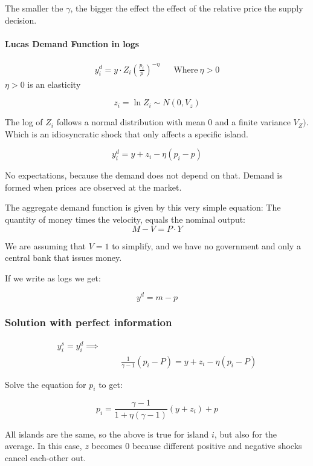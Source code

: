 The smaller the $\gamma$, the bigger the effect the effect of the relative price the supply decision.

\paragraph{Lucas Demand Function in logs}
\begin{align*}
    y_i^d = y \cdot Z_i \left( \frac{p_i}{p}  \right)^{- \eta} && \text{Where} \ \eta > 0
\end{align*}
$\eta > 0$ is an elasticity 

$$
z_i = \ln Z_i \sim N(0, V_z)
$$

The log of $Z_i$ follows a normal distribution with mean 0 and a finite variance $V_Z)$. Which is an idiosyncratic shock that only affects a specific island.  

$$
y^d_i = y + z_i - \eta (p_i - p)
$$

No expectations, because the demand does not depend on that. Demand is formed when prices are observed at the market. 


The aggregate demand function is given by this very simple equation:
The quantity of money times the velocity, equals the nominal output:
$$
M - V = P \cdot Y
$$

We are assuming that $V = 1$ to simplify, and we have no government and only a central bank that issues money. 

If we write as logs we get:

\begin{equation}\label{lucas_agg_demand}
    y^d = m - p
\end{equation}


\subsubsection{Solution with perfect information}

\begin{align*}
    y^s_i = y^d_i \implies \\
    &&& \frac{1}{\gamma - 1} (p_i - P) = y + z_i - \eta (p_i - P)
\end{align*}

Solve the equation for $p_i$ to get:

$$
p_i = \frac{\gamma - 1}{1 + \eta (\gamma -1)} (y + z_i) + p
$$

All islands are the same, so the above is true for island $i$, but also for the average. In this case, $z$ becomes 0 because different positive and negative shocks cancel each-other out. 

